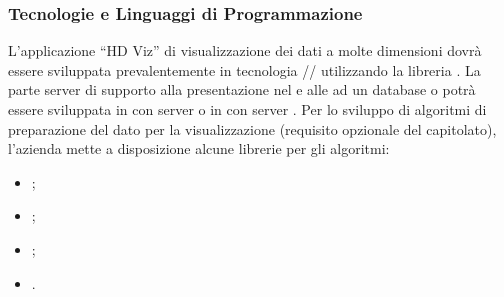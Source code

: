 \documentclass[]{article}
\begin{document}
		\subsubsection{Tecnologie e Linguaggi di Programmazione}
		L’applicazione “HD Viz” di visualizzazione dei dati a molte dimensioni dovrà essere sviluppata prevalentemente in tecnologia // utilizzando la libreria .
		La parte server di supporto alla presentazione nel  e alle  ad un database  o  potrà essere sviluppata in  con server  o in  con server .
		Per lo sviluppo di algoritmi di preparazione del dato per la visualizzazione (requisito opzionale del capitolato), l'azienda mette a disposizione alcune librerie per gli algoritmi:
		\begin{itemize}
			\item {};
			\item {};
			\item {};
			\item {}.
		\end{itemize}
\end{document}
